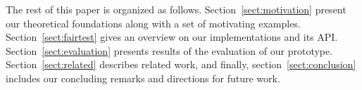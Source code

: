 The rest of this paper is organized as follows. Section~\ref{sect:motivation}
present our theoretical foundations along with a set of motivating examples.
Section~\ref{sect:fairtest} gives an overview on our \sysname implementations
and its API. Section~\ref{sect:evaluation} presents results of the evaluation of
our \sysname prototype. Section~\ref{sect:related} describes related work, and
finally, section~\ref{sect:conclusion} includes our concluding remarks and
directions for future work.
